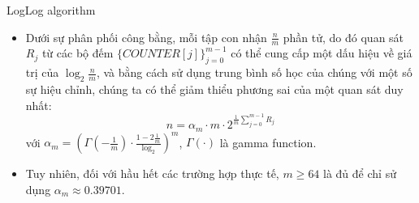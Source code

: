 \documentclass[10pt]{beamer}
\newcommand{\SubItem}[1]{
    {\setlength\itemindent{15pt} \item[-] #1}
}
\begin{document}
\begin{frame}{LogLog algorithm}
\begin{itemize}
  	\item Dưới sự phân phối công bằng, mỗi tập con nhận $\frac{n}{m}$ phần tử, do đó quan sát $R_j$ từ các bộ đếm $\{COUNTER[j]\}_{j=0}^{m-1}$ có thể cung cấp 
  một dấu hiệu về giá trị của $\log_2{\frac{n}{m}}$, và bằng cách sử dụng trung bình 
  số học của chúng với một số sự hiệu chỉnh, chúng ta có thể giảm thiểu phương sai 
  của một quan sát duy nhất: 
  \[n = \alpha_m \cdot m \cdot 2 ^{\frac{1}{m}\sum\limits_{j=0}^{m-1}R_j}\]
  với $\alpha_m = \left(\Gamma\left(-\frac{1}{m}\right)\cdot \frac{1-2\frac{1}{m}}{\log_2}\right)^m$, $\Gamma(\cdot)$ là gamma function.\\ 
  \item Tuy nhiên, đối với hầu hết các trường hợp thực tế, $m \geq 64$ là đủ để chỉ sử dụng 
  $\alpha_m \approx 0.39701$.
\end{itemize}

\end{frame}
\end{document}
